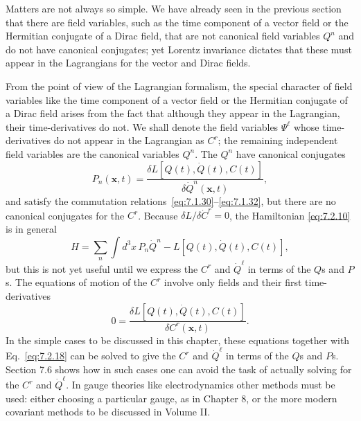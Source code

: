Matters are not always so simple. We have already seen in the previous
section that there are field variables, such as the time component of a
vector field or the Hermitian conjugate of a Dirac field, that are not
canonical field variables $Q^n$ and do not have canonical conjugates; yet
Lorentz invariance dictates that these must appear in the Lagrangians for
the vector and Dirac fields.

From the point of view of the Lagrangian formalism, the special character
of field variables like the time component of a vector field or the
Hermitian conjugate of a Dirac field arises from the fact that although
they appear in the Lagrangian, their time-derivatives do not. We shall
denote the field variables $\Psi^\ell$ whose time-derivatives do not appear in
the Lagrangian as $C^r$; the remaining independent field variables are the
canonical variables $Q^n$. The $Q^n$ have canonical conjugates
\begin{equation}
P_n(\mathbf{x},t)=
\frac{\delta L[Q(t),\dot Q(t),C(t)]}{\delta\dot Q^n(\mathbf{x},t)},
\tag{7.2.18}\label{eq:7.2.18}
\end{equation}
and satisfy the commutation relations~\eqref{eq:7.1.30}--\eqref{eq:7.1.32}, but there are no
canonical conjugates for the $C^r$. Because $\delta L/\delta\dot C^r=0$, the
Hamiltonian \eqref{eq:7.2.10} is in general
\begin{equation}
H=\sum_n\int d^3x\,P_n\dot Q^n-L[Q(t),\dot Q(t),C(t)],
\tag{7.2.19}\label{eq:7.2.19}
\end{equation}
but this is not yet useful until we express the $C^r$ and $\dot Q^\ell$ in terms of the
$Q$s and $P$s. The equations of motion of the $C^r$ involve only fields and
their first time-derivatives
\begin{equation}
0=\frac{\delta L[Q(t),\dot Q(t),C(t)]}{\delta C^r(\mathbf{x},t)}.
\tag{7.2.20}\label{eq:7.2.20}
\end{equation}
In the simple cases to be discussed in this chapter, these equations together
with Eq.~\eqref{eq:7.2.18} can be solved to give the $C^r$ and $\dot Q^\ell$ in terms of the
$Q$s and $P$s. Section 7.6 shows how in such cases one can avoid the task of
actually solving for the $C^r$ and $\dot Q^\ell$. In gauge theories like electrodynamics
other methods must be used: either choosing a particular gauge, as in
Chapter 8, or the more modern covariant methods to be discussed in
Volume II.

